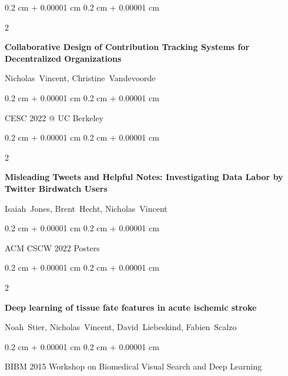 \documentclass[10pt, letterpaper]{article}
\newenvironment{onecolentry}{
    \begin{adjustwidth}{
        0.2 cm + 0.00001 cm
    }{
        0.2 cm + 0.00001 cm
    }
}{
    \end{adjustwidth}
} %
\newenvironment{twocolentry}[2][]{
    \onecolentry
    \def\secondColumn{#2}
    \setcolumnwidth{\fill, 4.1 cm}
    \begin{paracol}{2}
}{
    \switchcolumn \raggedleft \secondColumn
    \end{paracol}
    \endonecolentry
} %
\begin{document}
        \vspace{0.2 cm}

        \begin{samepage}
            \begin{twocolentry}{
                2022
            }
                \textbf{Collaborative Design of Contribution Tracking Systems for Decentralized Organizations}

                \vspace{0.10 cm}

                \mbox{Nicholas Vincent}, \mbox{Christine Vandevoorde}
            \end{twocolentry}


            \vspace{0.10 cm}

            \begin{onecolentry}
        CESC 2022 @ UC Berkeley    \end{onecolentry}
        \end{samepage}

        \vspace{0.2 cm}

        \begin{samepage}
            \begin{twocolentry}{
                2022
            }
                \textbf{Misleading Tweets and Helpful Notes: Investigating Data Labor by Twitter Birdwatch Users}

                \vspace{0.10 cm}

                \mbox{Isaiah Jones}, \mbox{Brent Hecht}, \mbox{Nicholas Vincent}
            \end{twocolentry}


            \vspace{0.10 cm}

            \begin{onecolentry}
        ACM CSCW 2022 Posters    \end{onecolentry}
        \end{samepage}

        \vspace{0.2 cm}

        \begin{samepage}
            \begin{twocolentry}{
                2015
            }
                \textbf{Deep learning of tissue fate features in acute ischemic stroke}

                \vspace{0.10 cm}

                \mbox{Noah Stier}, \mbox{Nicholas Vincent}, \mbox{David Liebeskind}, \mbox{Fabien Scalzo}
            \end{twocolentry}


            \vspace{0.10 cm}

            \begin{onecolentry}
        BIBM 2015 Workshop on Biomedical Visual Search and Deep Learning    \end{onecolentry}
        \end{samepage}
\end{document}
